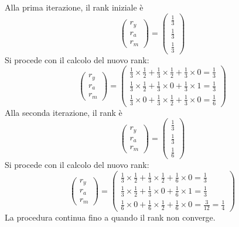 \documentclass{report}
\begin{document}
	Alla prima iterazione, il rank iniziale è
	\[
	\begin{pmatrix}
	r_y \\
	r_a \\
	r_m
	\end{pmatrix}
	=
	\begin{pmatrix}
	\frac{1}{3} \\
	\frac{1}{3} \\
	\frac{1}{3}
	\end{pmatrix}
	\]
	Si procede con il calcolo del nuovo rank:
	\[
	\begin{pmatrix}
	r_y \\
	r_a \\
	r_m
	\end{pmatrix}
	=
	\begin{pmatrix}
		\frac{1}{3} \times \frac{1}{2} + \frac{1}{3} \times \frac{1}{2} + \frac{1}{3} \times 0 = \frac{1}{3} \\
		\frac{1}{3} \times \frac{1}{2} + \frac{1}{3} \times 0 + \frac{1}{3} \times 1 = \frac{1}{3} \\
		\frac{1}{3} \times 0 + \frac{1}{3} \times \frac{1}{2} + \frac{1}{3} \times 0 = \frac{1}{6}
	\end{pmatrix}
	\]
	Alla seconda iterazione, il rank è
	\[
	\begin{pmatrix}
	r_y \\
	r_a \\
	r_m
	\end{pmatrix}
	=
	\begin{pmatrix}
	\frac{1}{3} \\
	\frac{1}{3} \\
	\frac{1}{6}
	\end{pmatrix}
	\]
	Si procede con il calcolo del nuovo rank:
	\[
	\begin{pmatrix}
	r_y \\
	r_a \\
	r_m
	\end{pmatrix}
	=
	\begin{pmatrix}
		\frac{1}{3} \times \frac{1}{2} + \frac{1}{3} \times \frac{1}{2} + \frac{1}{6} \times 0 = \frac{1}{3} \\
		\frac{1}{3} \times \frac{1}{2} + \frac{1}{3} \times 0 + \frac{1}{6} \times 1 = \frac{1}{3} \\
		\frac{1}{6} \times 0 + \frac{1}{6} \times \frac{1}{2} + \frac{1}{6} \times 0 = \frac{3}{12} = \frac{1}{4}
	\end{pmatrix}
	\]
	La procedura continua fino a quando il rank non converge.
\end{document}
